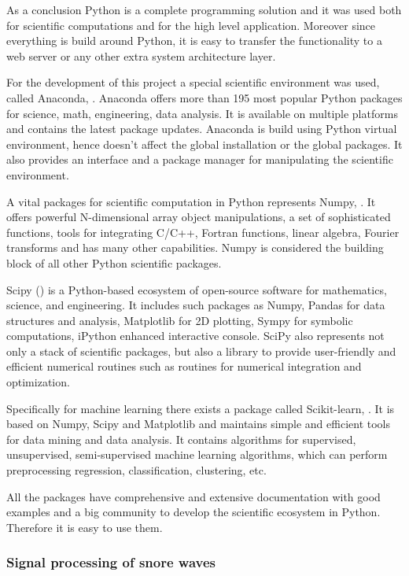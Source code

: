 As a conclusion Python is a complete programming solution and it was used both for scientific computations and for the high level application. Moreover since everything is build around Python, it is easy to transfer the functionality to a web server or any other extra system architecture layer.

For the development of this project a special scientific environment was used, called Anaconda, \cite{anaconda}. Anaconda offers more than 195 most popular Python packages for science, math, engineering, data analysis. It is available on multiple platforms and contains the latest package updates. Anaconda is build using Python virtual environment, hence doesn't affect the global installation or the global packages. It also provides an interface and a package manager for manipulating the scientific environment.

A vital packages for scientific computation in Python represents Numpy, \cite{numpy}. It offers powerful N-dimensional array object manipulations, a set of sophisticated functions, tools for integrating C/C++, Fortran functions, linear algebra, Fourier transforms and has many other capabilities. Numpy is considered the building block of all other Python scientific packages.

Scipy (\cite{scipy}) is a Python-based ecosystem of open-source software for mathematics, science, and engineering. It includes such packages as Numpy, Pandas for data structures and analysis, Matplotlib for 2D plotting, Sympy for symbolic computations, iPython enhanced interactive console. SciPy also represents not only a stack of scientific packages, but also a library to provide user-friendly and efficient numerical routines such as routines for numerical integration and optimization.

Specifically for machine learning there exists a package called Scikit-learn, \cite{scikit-learn}. It is based on Numpy, Scipy and Matplotlib and maintains simple and efficient tools for data mining and data analysis. It contains algorithms for supervised, unsupervised, semi-supervised machine learning algorithms, which can perform preprocessing regression, classification, clustering, etc. 

All the packages have comprehensive and extensive documentation with good examples and a big community to develop the scientific ecosystem in Python. Therefore it is easy to use them.

\subsubsection{Signal processing of snore waves}

